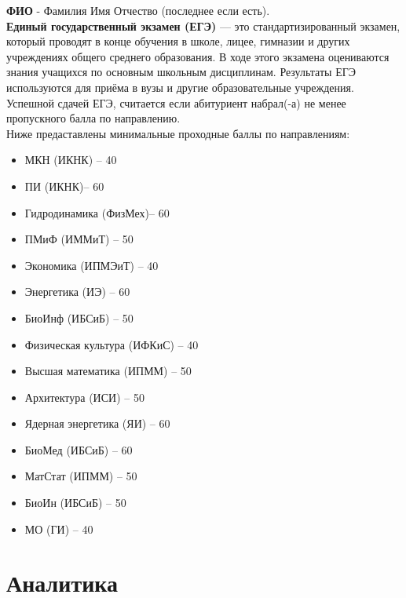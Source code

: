 \documentclass[areasetadvanced]{scrartcl}
\begin{document}
\textbf{ФИО} - Фамилия Имя Отчество (последнее если есть).\\
\textbf{Единый государственный экзамен (ЕГЭ)} — это стандартизированный экзамен, который
проводят в конце обучения в школе, лицее, гимназии и других учреждениях общего среднего
образования. В ходе этого экзамена оцениваются знания учащихся по основным школьным
дисциплинам. Результаты ЕГЭ используются для приёма в вузы и другие образовательные
учреждения. Успешной сдачей ЕГЭ, считается если абитуриент набрал(-а) не менее
пропускного балла по направлению.\\
Ниже предаставлены минимальные проходные баллы по направлениям:
\begin{itemize}
    \item МКН (ИКНК) – 40
    \item ПИ (ИКНК)– 60
    \item Гидродинамика (ФизМех)– 60
    \item ПМиФ (ИММиТ) – 50
    \item Экономика (ИПМЭиТ) – 40
    \item Энергетика (ИЭ) – 60
    \item БиоИнф (ИБСиБ) – 50
    \item Физическая культура (ИФКиС) – 40
    \item Высшая математика (ИПММ) – 50
    \item Архитектура (ИСИ) – 50
    \item Ядерная энергетика (ЯИ) – 60
    \item БиоМед (ИБСиБ) – 60
    \item МатСтат (ИПММ) – 50
    \item БиоИн (ИБСиБ) – 50
    \item МО (ГИ) – 40
\end{itemize}
\newpage
\section{Аналитика}
\end{document}
